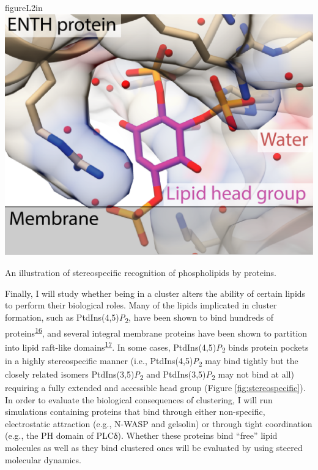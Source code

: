 \documentclass[11pt,notitlepage]{article}
\begin{document}
\begin{wrapfloat}{figure}{L}{2in}
\centering
\includegraphics{content/images/stereospecific.png}
\caption{An illustration of stereospecific recognition of phospholipids
by proteins.}
\label{fig:stereospecific}
\end{wrapfloat}

Finally, I will study whether being in a cluster alters the ability of
certain lipids to perform their biological roles. Many of the lipids
implicated in cluster formation, such as
PtdIns(4,5)\emph{P}\textsubscript{2}, have been shown to bind hundreds
of proteins\textsuperscript{\protect\hyperlink{ref-uyKE7bWV}{16}}, and
several integral membrane proteins have been shown to partition into
lipid raft-like
domains\textsuperscript{\protect\hyperlink{ref-2TfZ4zWV}{17}}. In some
cases, PtdIns(4,5)\emph{P}\textsubscript{2} binds protein pockets in a
highly stereospecific manner (i.e., PtdIns(4,5)\emph{P}\textsubscript{2}
may bind tightly but the closely related isomers
PtdIns(3,5)\emph{P}\textsubscript{2} and
PtdIns(3,5)\emph{P}\textsubscript{2} may not bind at all) requiring a
fully extended and accessible head group (Figure
\ref{fig:stereospecific}). In order to evaluate the biological
consequences of clustering, I will run simulations containing proteins
that bind through either non-specific, electrostatic attraction (e.g.,
N-WASP and gelsolin) or through tight coordination (e.g., the PH domain
of PLCδ). Whether these proteins bind ``free'' lipid molecules as well
as they bind clustered ones will be evaluated by using steered molecular
dynamics.
\end{document}
